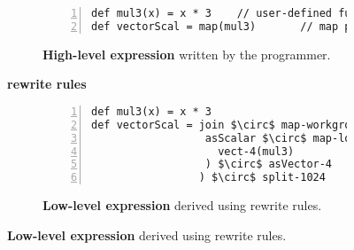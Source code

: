 \begin{figure}[t]
\centering

\begin{subfigure}[b]{.85\linewidth}%
\begin{lstlisting}[mathescape,numbers=left]
def mul3(x) = x * 3    // user-defined function
def vectorScal = map(mul3)       // map pattern
\end{lstlisting}
\caption{\textbf{High-level expression} written by the programmer.}
\label{fig:codeex:map}
\end{subfigure}

\vspace{-10pt}
\begin{minipage}{0.1\linewidth}
\vspace{0pt}
\centering
{}
\end{minipage}
\begin{minipage}{0.25\linewidth}
\vspace{-5pt}
\centering
\textbf{rewrite rules}
\end{minipage}
\begin{minipage}{0.1\linewidth}
\vspace{0pt}
\centering
{}
\end{minipage}

\vspace{-5pt}
\begin{subfigure}[b]{\linewidth}
\centering
\begin{minipage}{.85\linewidth}%
\begin{lstlisting}[mathescape,numbers=left]
def mul3(x) = x * 3
def vectorScal = join $\circ$ map-workgroup(
                  asScalar $\circ$ map-local(
                    vect-4(mul3)
                  ) $\circ$ asVector-4
                 ) $\circ$ split-1024
\end{lstlisting}
\end{minipage}
\caption{\textbf{Low-level expression} derived using rewrite rules.}
\label{fig:codeex:impl}
\end{subfigure}


\end{figure}
